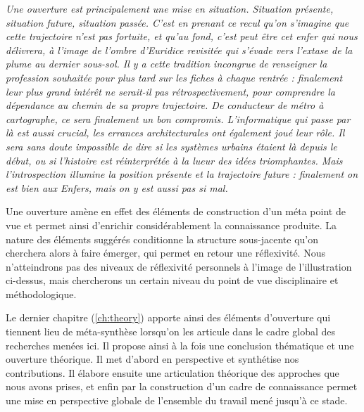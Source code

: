 












\textit{Une ouverture est principalement une mise en situation. Situation présente, situation future, situation passée. C'est en prenant ce recul qu'on s'imagine que cette trajectoire n'est pas fortuite, et qu'au fond, c'est peut être cet enfer qui nous délivrera, à l'image de l'ombre d'Euridice revisitée qui s'évade vers l'extase de la plume au dernier sous-sol. Il y a cette tradition incongrue de renseigner la profession souhaitée pour plus tard sur les fiches à chaque rentrée : finalement leur plus grand intérêt ne serait-il pas rétrospectivement, pour comprendre la dépendance au chemin de sa propre trajectoire. De conducteur de métro à cartographe, ce sera finalement un bon compromis. L'informatique qui passe par là est aussi crucial, les errances architecturales ont également joué leur rôle. Il sera sans doute impossible de dire si les systèmes urbains étaient là depuis le début, ou si l'histoire est réinterprétée à la lueur des idées triomphantes. Mais l'introspection illumine la position présente et la trajectoire future : finalement on est bien aux Enfers, mais on y est aussi pas si mal.}


\bigskip

Une ouverture amène en effet des éléments de construction d'un méta point de vue et permet ainsi d'enrichir considérablement la connaissance produite. La nature des éléments suggérés conditionne la structure sous-jacente qu'on cherchera alors à faire émerger, qui permet en retour une réflexivité. Nous n'atteindrons pas des niveaux de réflexivité personnels à l'image de l'illustration ci-dessus, mais chercherons un certain niveau du point de vue disciplinaire et méthodologique.

Le dernier chapitre (\ref{ch:theory}) apporte ainsi des éléments d'ouverture qui tiennent lieu de méta-synthèse lorsqu'on les articule dans le cadre global des recherches menées ici. Il propose ainsi à la fois une conclusion thématique et une ouverture théorique. Il met d'abord en perspective et synthétise nos contributions. Il élabore ensuite une articulation théorique des approches que nous avons prises, et enfin par la construction d'un cadre de connaissance permet une mise en perspective globale de l'ensemble du travail mené jusqu'à ce stade.



